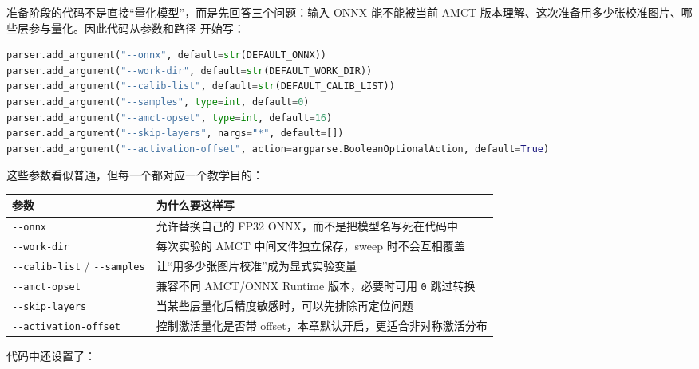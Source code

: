 准备阶段的代码不是直接``量化模型''，而是先回答三个问题：输入 ONNX
能不能被当前 AMCT
版本理解、这次准备用多少张校准图片、哪些层参与量化。因此代码从参数和路径
开始写：

\begin{lstlisting}[language=Python]
parser.add_argument("--onnx", default=str(DEFAULT_ONNX))
parser.add_argument("--work-dir", default=str(DEFAULT_WORK_DIR))
parser.add_argument("--calib-list", default=str(DEFAULT_CALIB_LIST))
parser.add_argument("--samples", type=int, default=0)
parser.add_argument("--amct-opset", type=int, default=16)
parser.add_argument("--skip-layers", nargs="*", default=[])
parser.add_argument("--activation-offset", action=argparse.BooleanOptionalAction, default=True)
\end{lstlisting}

这些参数看似普通，但每一个都对应一个教学目的：

\begin{longtable}[]{@{}
  >{\raggedright\arraybackslash}p{}
  >{\raggedright\arraybackslash}p{}@{}}
\toprule\noalign{}
\begin{minipage}[b]{\linewidth}\raggedright
参数
\end{minipage} & \begin{minipage}[b]{\linewidth}\raggedright
为什么要这样写
\end{minipage} \\
\midrule\noalign{}
\endhead
\bottomrule\noalign{}
\endlastfoot
\passthrough{\lstinline!--onnx!} & 允许替换自己的 FP32
ONNX，而不是把模型名写死在代码中 \\
\passthrough{\lstinline!--work-dir!} & 每次实验的 AMCT
中间文件独立保存，sweep 时不会互相覆盖 \\
\passthrough{\lstinline!--calib-list!} /
\passthrough{\lstinline!--samples!} &
让``用多少张图片校准''成为显式实验变量 \\
\passthrough{\lstinline!--amct-opset!} & 兼容不同 AMCT/ONNX Runtime
版本，必要时可用 \passthrough{\lstinline!0!} 跳过转换 \\
\passthrough{\lstinline!--skip-layers!} &
当某些层量化后精度敏感时，可以先排除再定位问题 \\
\passthrough{\lstinline!--activation-offset!} & 控制激活量化是否带
offset，本章默认开启，更适合非对称激活分布 \\
\end{longtable}

代码中还设置了：

